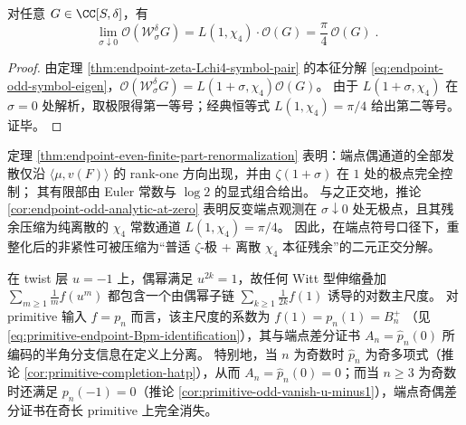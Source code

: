 \begin{corollary}\label{cor:endpoint-odd-analytic-at-zero}
对任意 \(G\in\CC[S,\delta]\)，有
\begin{equation}\label{eq:endpoint-odd-limit-L1-chi4}
\boxed{\;
\lim_{\sigma\downarrow 0}\mathcal O(\mathcal W_{\sigma}^{\delta}G)
=L(1,\chi_{4})\cdot \mathcal O(G)
=\frac{\pi}{4}\,\mathcal O(G)\; }.
\end{equation}
\end{corollary}

\begin{proof}
由定理 \ref{thm:endpoint-zeta-Lchi4-symbol-pair} 的本征分解 \eqref{eq:endpoint-odd-symbol-eigen}，\(\mathcal O(\mathcal W_{\sigma}^{\delta}G)=L(1+\sigma,\chi_4)\mathcal O(G)\)。
由于 \(L(1+\sigma,\chi_4)\) 在 \(\sigma=0\) 处解析，取极限得第一等号；经典恒等式 \(L(1,\chi_4)=\pi/4\) 给出第二等号。证毕。
\end{proof}

\begin{remark}\label{rem:endpoint-renormalization-universal-pole-discrete-hair}
定理 \ref{thm:endpoint-even-finite-part-renormalization} 表明：端点偶通道的全部发散仅沿
\(\langle\mu,v(F)\rangle\) 的 rank-one 方向出现，并由 \(\zeta(1+\sigma)\) 在 \(1\) 处的极点完全控制；
其有限部由 Euler 常数与 \(\log 2\) 的显式组合给出。
与之正交地，推论 \ref{cor:endpoint-odd-analytic-at-zero} 表明反变端点观测在 \(\sigma\downarrow 0\) 处无极点，且其残余压缩为纯离散的 \(\chi_4\) 常数通道 \(L(1,\chi_4)=\pi/4\)。
因此，在端点符号口径下，重整化后的非紧性可被压缩为“普适 \(\zeta\)-极 + 离散 \(\chi_4\) 本征残余”的二元正交分解。
\end{remark}

\begin{remark}[端点对数主尺度与相位精度解耦：\texorpdfstring{$u=-1$}{u=-1} 下偶幂通道的计数控制]\label{rem:endpoint-logscale-parity-decouple}
在 twist 层 \(u=-1\) 上，偶幂满足 \(u^{2k}=1\)，故任何 Witt 型伸缩叠加
\(
\sum_{m\ge 1}\frac1m f(u^m)
\)
都包含一个由偶幂子链 \(\sum_{k\ge 1}\frac{1}{2k}f(1)\) 诱导的对数主尺度。
对 primitive 输入 \(f=p_n\) 而言，该主尺度的系数为
\(
f(1)=p_n(1)=B_n^{+}
\)
（见 \eqref{eq:primitive-endpoint-Bpm-identification}），其与端点差分证书
\(
A_n=\widehat p_n(0)
\)
所编码的半角分支信息在定义上分离。
特别地，当 \(n\) 为奇数时 \(\widehat p_n\) 为奇多项式（推论 \ref{cor:primitive-completion-hatp}），从而 \(A_n=\widehat p_n(0)=0\)；而当 \(n\ge 3\) 为奇数时还满足 \(p_n(-1)=0\)（推论 \ref{cor:primitive-odd-vanish-u-minus1}），端点奇偶差分证书在奇长 primitive 上完全消失。
\end{remark}

